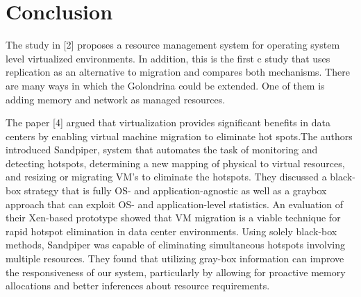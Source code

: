 \documentclass[conference]{IEEEtran}
\begin{document}
\section{Conclusion}
The study in [2] proposes a resource management system for operating system level virtualized environments. In addition, this is the first c study that uses replication as an alternative to migration
and compares both mechanisms.
There are many ways in which the Golondrina could be extended. One of them is adding memory and network as managed resources. 





The paper [4] argued that virtualization provides significant
benefits in data centers by enabling virtual machine
migration to eliminate hot spots.The authors introduced Sandpiper,  system that automates the task of monitoring and detecting
hotspots, determining a new mapping of physical to
virtual resources, and resizing or migrating VM’s to eliminate
the hotspots. They discussed a black-box strategy that
is fully OS- and application-agnostic as well as a graybox
approach that can exploit OS- and application-level
statistics. An evaluation of their Xen-based prototype
showed that VM migration is a viable technique for rapid
hotspot elimination in data center environments. Using solely
black-box methods, Sandpiper was capable of eliminating
simultaneous hotspots involving multiple resources.
They found that utilizing gray-box information can improve
the responsiveness of our system, particularly by allowing
for proactive memory allocations and better inferences
about resource requirements.













\end{document}
